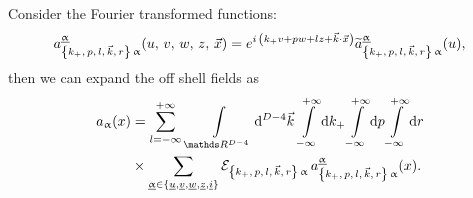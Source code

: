 Consider the Fourier transformed functions:
\begin{equation}
  a^{\underline{\upalpha}}_{\qty{k_+,\, p,\, l,\, \vec{k},\, r}\, \upalpha}\qty( u,\, v,\, w,\, z,\, \vec{x} )
  =
  e^{i\, \qty(k_+ v + p w + l z + \vec{k} \cdot \vec{x})}
  \widetilde{a}^{\underline{\upalpha}}_{\qty{k_+,\, p,\, l,\, \vec{k},\, r}\, \upalpha}( u ),
\end{equation}
then we can expand the off shell fields as
\begin{equation}
  \begin{split}
    a_{\alpha}(x)
    & =
    \infinfsum{l}\,
    \int\limits_{\R^{D-4}} \dd[D-4]{\vec{k}}\,
    \infinfint{k_+}
    \infinfint{p}
    \infinfint{r}
    \\
    & \times
    \sum_{\ualpha \in \qty{\underu, \underv, \underw, \underz, \underi}}
    \cE_{\kmkrgen\, \alpha}\,
    a^{\ualpha}_{\kmkrgen\, \alpha}(x).
  \end{split}
\end{equation}

